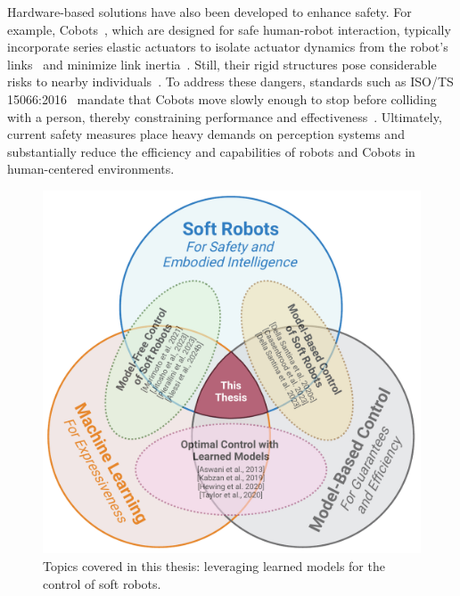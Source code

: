 Hardware-based solutions have also been developed to enhance safety. For example, \glspl{Cobot}~\citep{el2019cobot}, which are designed for safe human-robot interaction, typically incorporate series elastic actuators to isolate actuator dynamics from the robot’s links~\citep{pratt1995series} and minimize link inertia~\citep{albu2007dlr}. Still, their rigid structures pose considerable risks to nearby individuals~\citep{haddadin2013towards}. To address these dangers, standards such as ISO/TS 15066:2016~\citep{iso2016collaborative} mandate that \glspl{Cobot} move slowly enough to stop before colliding with a person, thereby constraining performance and effectiveness~\citep{ajoudani2018progress, lucci2020combining}. Ultimately, current safety measures place heavy demands on perception systems and substantially reduce the efficiency and capabilities of robots and \glspl{Cobot} in human-centered environments.

\begin{figure}[ht]
    \centering
    \includegraphics[width=0.8\linewidth]{introduction/figures/thesis_topics_venn_v2.pdf}
    \caption{Topics covered in this thesis: leveraging learned models for the control of soft robots.}
    \label{fig:introduction:topics_venn}
\end{figure}

